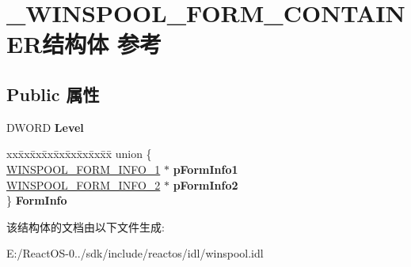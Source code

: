 \hypertarget{struct___w_i_n_s_p_o_o_l___f_o_r_m___c_o_n_t_a_i_n_e_r}{}\section{\+\_\+\+W\+I\+N\+S\+P\+O\+O\+L\+\_\+\+F\+O\+R\+M\+\_\+\+C\+O\+N\+T\+A\+I\+N\+E\+R结构体 参考}
\label{struct___w_i_n_s_p_o_o_l___f_o_r_m___c_o_n_t_a_i_n_e_r}
\subsection*{Public 属性}
\begin{DoxyCompactItemize}
\item 
\mbox{\label{struct___w_i_n_s_p_o_o_l___f_o_r_m___c_o_n_t_a_i_n_e_r_afd3e23c990574d116d80253414ab9c92}} 
D\+W\+O\+RD {\bfseries Level}
\item 
\mbox{\label{struct___w_i_n_s_p_o_o_l___f_o_r_m___c_o_n_t_a_i_n_e_r_a9d2e555248513c1a281c25191100ba37}} 
\begin{tabbing}
xx\=xx\=xx\=xx\=xx\=xx\=xx\=xx\=xx\=\kill
union \{\\
\>\hyperlink{struct___w_i_n_s_p_o_o_l___f_o_r_m___i_n_f_o__1}{WINSPOOL\_FORM\_INFO\_1} $\ast$ {\bfseries pFormInfo1}\\
\>\hyperlink{struct___w_i_n_s_p_o_o_l___f_o_r_m___i_n_f_o__2}{WINSPOOL\_FORM\_INFO\_2} $\ast$ {\bfseries pFormInfo2}\\
\} {\bfseries FormInfo}\\

\end{tabbing}\end{DoxyCompactItemize}


该结构体的文档由以下文件生成\+:\begin{DoxyCompactItemize}
\item 
E\+:/\+React\+O\+S-\/0../sdk/include/reactos/idl/winspool.\+idl\end{DoxyCompactItemize}
